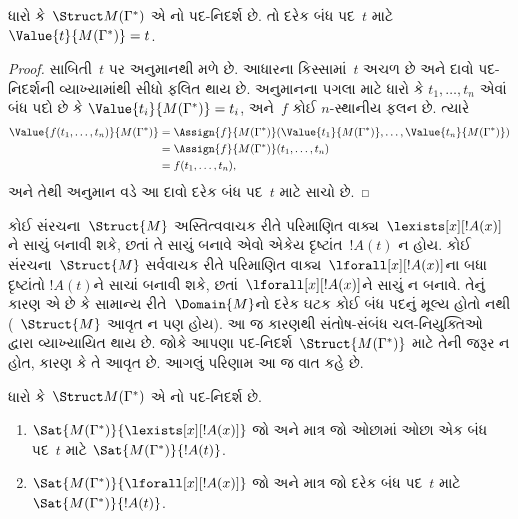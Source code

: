 \begin{lem}
 ધારો કે~$\Struct M(\Gamma^*)$ એ
નો પદ-નિદર્શ છે. તો દરેક બંધ પદ~$t$ માટે
$\Value{t}{M(\Gamma^*)}=t$.
\end{lem}
\begin{proof}
 સાબિતી~$t$ પર અનુમાનથી મળે છે. આધારના કિસ્સામાં~$t$ અચળ
 છે અને દાવો પદ-નિદર્શની વ્યાખ્યામાંથી સીધો ફલિત થાય છે. અનુમાનના
 પગલા માટે ધારો કે $t_1,\ldots,t_n$ એવાં બંધ પદો છે કે
 $\Value{t_i}{M(\Gamma^*)}=t_i$, અને~$f$ કોઈ $n$-સ્થાનીય
 ફલન છે. ત્યારે
\begin{align*}
\Value{f(t_1,\ldots,t_n)}{M(\Gamma^*)} &= \Assign{f}{M(\Gamma^*)}(\Value{t_1}
 {M(\Gamma^*)},
\ldots, \Value{t_n}{M(\Gamma^*)}) \\
&= \Assign{f}{M(\Gamma^*)}(t_1, \dots, t_n) \\
&= f(t_1,\dots, t_n),
\end{align*}
અને તેથી અનુમાન વડે આ દાવો દરેક બંધ પદ~$t$ માટે સાચો છે.
\end{proof}



%
\begin{explain}
  કોઈ સંરચના~$\Struct{M}$ અસ્તિત્વવાચક રીતે
    પરિમાણિત વાક્ય~$\lexists[x][!A(x)]$ને સાચું બનાવી શકે,
    છતાં તે સાચું બનાવે એવો એકેય દૃષ્ટાંત~$!A(t)$ ન હોય.
  કોઈ સંરચના~$\Struct{M}$ સર્વવાચક રીતે
    પરિમાણિત વાક્ય~$\lforall[x][!A(x)]$ના બધા દૃષ્ટાંતો
    $!A(t)$ને સાચાં બનાવી શકે, છતાં~$\lforall[x][!A(x)]$ને સાચું ન
    બનાવે. તેનું કારણ એ છે કે સામાન્ય રીતે~$\Domain{M}$નો દરેક
  ઘટક કોઈ બંધ પદનું મૂલ્ય હોતો નથી (~$\Struct{M}$ આવૃત ન પણ
  હોય). આ જ કારણથી સંતોષ-સંબંધ ચલ-નિયુક્તિઓ દ્વારા વ્યાખ્યાયિત થાય છે.
  જોકે આપણા પદ-નિદર્શ~$\Struct{M(\Gamma^*)}$ માટે તેની જરૂર ન હોત,
  કારણ કે તે આવૃત છે. આગલું પરિણામ આ જ વાત કહે છે.
\end{explain}

\begin{prop}
ધારો કે~$\Struct M(\Gamma^*)$ એ નો પદ-નિદર્શ છે.
\begin{enumerate}
\item $\Sat{M(\Gamma^*)}{\lexists[x][!A(x)]}$ જો અને માત્ર જો
  ઓછામાં ઓછા એક બંધ પદ~$t$ માટે $\Sat{M(\Gamma^*)}{!A(t)}$.
\item $\Sat{M(\Gamma^*)}{\lforall[x][!A(x)]}$ જો અને માત્ર
  જો દરેક બંધ પદ~$t$ માટે $\Sat{M(\Gamma^*)}{!A(t)}$.
\end{enumerate}
\end{prop}


